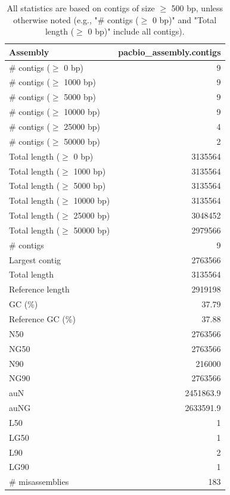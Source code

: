 \documentclass[12pt,a4paper]{article}
\begin{document}
\begin{table}[ht]
\begin{center}
\caption{All statistics are based on contigs of size $\geq$ 500 bp, unless otherwise noted (e.g., "\# contigs ($\geq$ 0 bp)" and "Total length ($\geq$ 0 bp)" include all contigs).}
\begin{tabular}{|l*{1}{|r}|}
\hline
Assembly & pacbio\_assembly.contigs \\ \hline
\# contigs ($\geq$ 0 bp) & 9 \\ \hline
\# contigs ($\geq$ 1000 bp) & 9 \\ \hline
\# contigs ($\geq$ 5000 bp) & 9 \\ \hline
\# contigs ($\geq$ 10000 bp) & 9 \\ \hline
\# contigs ($\geq$ 25000 bp) & 4 \\ \hline
\# contigs ($\geq$ 50000 bp) & 2 \\ \hline
Total length ($\geq$ 0 bp) & 3135564 \\ \hline
Total length ($\geq$ 1000 bp) & 3135564 \\ \hline
Total length ($\geq$ 5000 bp) & 3135564 \\ \hline
Total length ($\geq$ 10000 bp) & 3135564 \\ \hline
Total length ($\geq$ 25000 bp) & 3048452 \\ \hline
Total length ($\geq$ 50000 bp) & 2979566 \\ \hline
\# contigs & 9 \\ \hline
Largest contig & 2763566 \\ \hline
Total length & 3135564 \\ \hline
Reference length & 2919198 \\ \hline
GC (\%) & 37.79 \\ \hline
Reference GC (\%) & 37.88 \\ \hline
N50 & 2763566 \\ \hline
NG50 & 2763566 \\ \hline
N90 & 216000 \\ \hline
NG90 & 2763566 \\ \hline
auN & 2451863.9 \\ \hline
auNG & 2633591.9 \\ \hline
L50 & 1 \\ \hline
LG50 & 1 \\ \hline
L90 & 2 \\ \hline
LG90 & 1 \\ \hline
\# misassemblies & 183 \\ \hline

\end{tabular}
\end{center}
\end{table}
\end{document}
